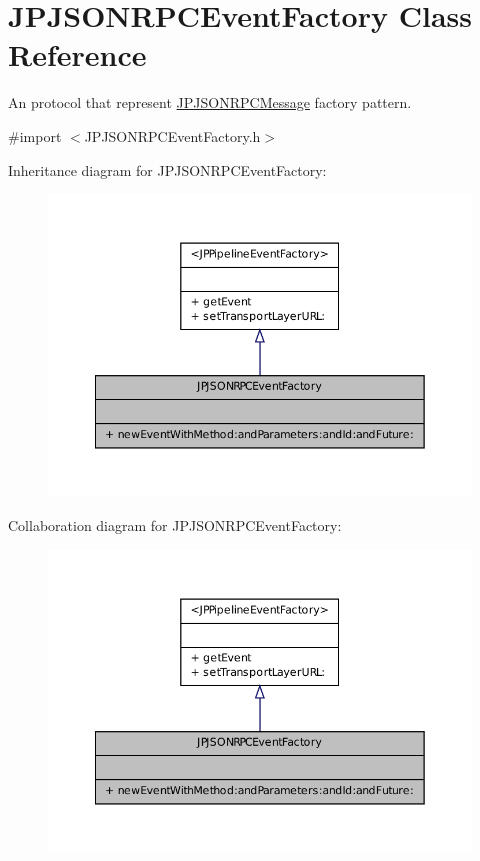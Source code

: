 \hypertarget{a00017}{
\section{JPJSONRPCEventFactory Class Reference}
\label{a00017}
}


An protocol that represent \hyperlink{a00018}{JPJSONRPCMessage} factory pattern.  




{\ttfamily \#import $<$JPJSONRPCEventFactory.h$>$}



Inheritance diagram for JPJSONRPCEventFactory:\nopagebreak
\begin{figure}[H]
\begin{center}
\leavevmode
\includegraphics[width=352pt]{a00112}
\end{center}
\end{figure}


Collaboration diagram for JPJSONRPCEventFactory:\nopagebreak
\begin{figure}[H]
\begin{center}
\leavevmode
\includegraphics[width=352pt]{a00113}
\end{center}
\end{figure}
